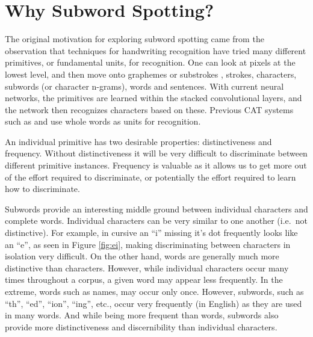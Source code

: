 \documentclass[ms,electronic,twosidetoc,letterpaper,chaptercenter,parttop,lol,lof,lot]{byumsphd}
\begin{document}

\section{Why Subword Spotting?}

The original motivation for exploring subword spotting came from the observation that techniques for handwriting recognition have tried many different primitives, or fundamental units, for recognition. One can look at pixels at the lowest level, and then move onto graphemes or substrokes \cite{liang2012}, strokes, characters, subwords (or character n-grams), words and sentences. With current neural networks, the primitives are learned within the stacked convolutional layers, and the network then recognizes characters based on these. Previous CAT systems such as \cite{Clawson2014} and \cite{Zagoris2015} use whole words as units for recognition. 



An individual primitive has two desirable properties: distinctiveness and frequency. Without distinctiveness it will be very difficult to discriminate between different primitive instances. Frequency is valuable as it allows us to get more out of the effort required to discriminate, or potentially the effort required to learn how to discriminate.

Subwords provide an interesting middle ground between individual characters and complete words. %
Individual characters can be very similar to one another (i.e.~not distinctive). For example, in cursive an ``i'' missing it's dot frequently looks like an ``e'', as seen in Figure \ref{fig:ei}, making discriminating between characters in isolation very difficult. On the other hand, words are generally much more distinctive than characters. However, while individual characters occur many times throughout a corpus, a given word may appear less frequently. In the extreme, words such as names, may occur only once. However, subwords, such as ``th'', ``ed'', ``ion'', ``ing'', etc., occur very frequently (in English) as they are used in many words. And while being more frequent than words, subwords also provide more distinctiveness and discernibility than individual characters.
\end{document}
